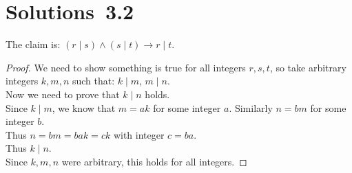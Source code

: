\section*{Solutions~3.2}%

\begin{solutions}
\setcounter{solutioncounter}{4}
\solution
The claim is: $(r \mid s) \wedge (s \mid t) \to r \mid t$.
\begin{proof}
	We need to show something is true for all integers $r, s, t$, so take arbitrary integers $k, m, n$ such that: $k \mid
	m$, $m \mid n$. \\
	Now we need to prove that $k \mid n$ holds.\\
	Since $k \mid m$, we know that $m = ak$ for some integer $a$. Similarly $n = bm$ for some integer $b$. \\
	Thus $n = bm = bak = ck$ with integer $c= ba$. \\
	Thus $k \mid n$.\\
	Since $k,m,n$ were arbitrary, this holds for all integers.
\end{proof}

\end{solutions}
